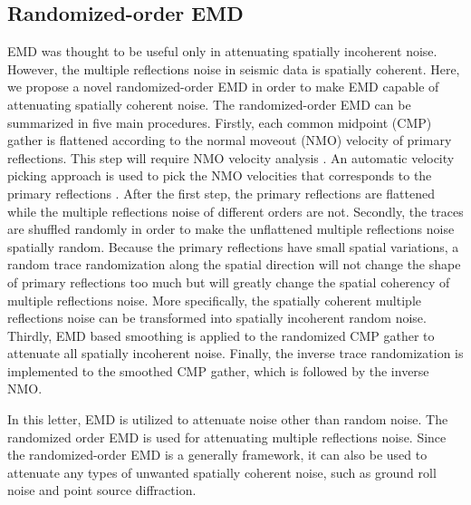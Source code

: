 \subsection{Randomized-order EMD}
EMD was thought to be useful only in attenuating spatially incoherent noise. However, the multiple reflections noise in seismic data is spatially coherent. Here, we propose a novel randomized-order EMD in order to make EMD capable of attenuating spatially coherent noise. The randomized-order EMD can be summarized in five main procedures. Firstly, each common midpoint (CMP) gather is flattened according to the normal moveout (NMO) velocity of primary reflections. This step will require NMO velocity analysis \cite{yangkang2015vel,shuwei2016vscan}. An automatic velocity picking approach is used to pick the NMO velocities that corresponds to the primary reflections \cite{fomel20091}. After the first step, the primary reflections are flattened while the multiple reflections noise of different orders are not. Secondly, the traces are shuffled randomly in order to make the unflattened multiple reflections noise spatially random. Because the primary reflections have small spatial variations, a random trace randomization along the spatial direction will not change the shape of primary reflections too much but will greatly change the spatial coherency of multiple reflections noise. More specifically, the spatially coherent multiple reflections noise can be transformed into spatially incoherent random noise. Thirdly, EMD based smoothing is applied to the randomized CMP gather to attenuate all spatially incoherent noise. Finally, the inverse trace randomization is implemented to the smoothed CMP gather, which is followed by the inverse NMO.  

In this letter, EMD is utilized to attenuate noise other than random noise. The randomized order EMD is used for attenuating multiple reflections noise. Since the randomized-order EMD is a generally framework, it can also be used to attenuate any types of unwanted spatially coherent noise, such as ground roll noise \cite{yangkang2015orthogroll} and point source diffraction.

